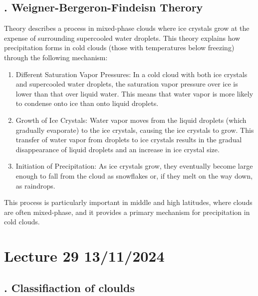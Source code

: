 \documentclass[fleqn,10pt]{SelfArx} %
\begin{document}
\subsection{. Weigner-Bergeron-Findeisn Therory}
Theory describes a process in mixed-phase clouds where ice crystals grow at the expense of surrounding supercooled water droplets. This theory explains how precipitation forms in cold clouds (those with temperatures below freezing) through the following mechanism:

\begin{enumerate}
    \item Different Saturation Vapor Pressures: In a cold cloud with both ice crystals and supercooled water droplets, the saturation vapor pressure over ice is lower than that over liquid water. This means that water vapor is more likely to condense onto ice than onto liquid droplets.
    \item Growth of Ice Crystals: Water vapor moves from the liquid droplets (which gradually evaporate) to the ice crystals, causing the ice crystals to grow. This transfer of water vapor from droplets to ice crystals results in the gradual disappearance of liquid droplets and an increase in ice crystal size.
    \item Initiation of Precipitation: As ice crystals grow, they eventually become large enough to fall from the cloud as snowflakes or, if they melt on the way down, as raindrops.
\end{enumerate}

This process is particularly important in middle and high latitudes, where clouds are often mixed-phase, and it provides a primary mechanism for precipitation in cold clouds.

\clearpage

\section{Lecture 29 13/11/2024}
\subsection{. Classifiaction of cloulds}
\end{document}
